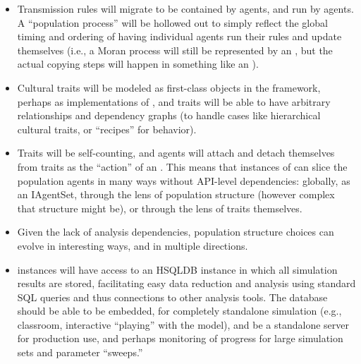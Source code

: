 \documentclass[pdftex,letterpaper,rmp,groupedaddress,floatfix]{revtex4}
\begin{document}
\begin{itemize}
\item Transmission rules will migrate to be contained by agents, and run by agents.  A ``population process'' will be hollowed out to simply reflect the global timing and ordering of having individual agents run their rules and update themselves (i.e., a Moran process will still be represented by an , but the actual copying steps will happen in something like an ).  
\item Cultural traits will be modeled as first-class objects in the framework, perhaps as implementations of , and traits will be able to have arbitrary relationships and dependency graphs (to handle cases like hierarchical cultural traits, or ``recipes'' for behavior).  
\item Traits will be self-counting, and agents will attach and detach themselves from traits as the ``action'' of an .  This means that instances of  can slice the population agents in many ways without API-level dependencies:  globally, as an IAgentSet, through the lens of population structure (however complex that structure might be), or through the lens of traits themselves.  
\item Given the lack of analysis dependencies, population structure choices can evolve in interesting ways, and in multiple directions.  
\item {} instances will have access to an HSQLDB instance in which all simulation results are stored, facilitating easy data reduction and analysis using standard SQL queries and thus connections to other analysis tools.  The database should be able to be embedded, for completely standalone simulation (e.g., classroom, interactive ``playing'' with the model), and be a standalone server for production use, and perhaps monitoring of progress for large simulation sets and parameter ``sweeps.''
\end{itemize}
\end{document}
